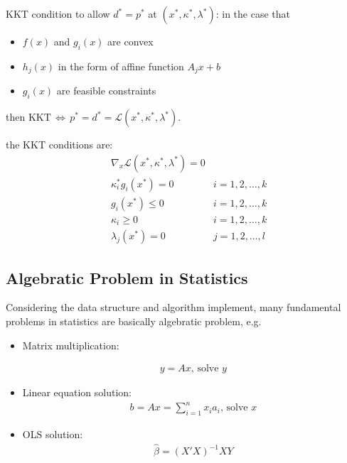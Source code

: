     KKT condition to allow $ d^*=p^* $ at $ (x^*,\kappa ^*,\lambda ^*) $: in the case that
\begin{itemize}[topsep=2pt,itemsep=0pt]
    \item $ f(x) $ and $ g_i(x) $ are convex
    \item $ h_j(x) $ in the form of affine function $ A_jx+b $
    \item $ g_i(x) $ are feasible constraints
\end{itemize}

    then $ \mathrm{KKT}\,\Leftrightarrow\, p^*=d^*=\mathcal{L}(x^*,\kappa ^*,\lambda ^*)  $.

    the KKT conditions are:
\begin{equation}\label{EqaKKTCondition}
    \begin{aligned}
    &\nabla_x\mathcal{L}(x^*,\kappa ^*,\lambda ^*)=0&\\
    &\kappa ^*_ig_i(x^*)=0&i=1,2,\ldots,k\\
    &g_i(x^*)\leq 0&i=1,2,\ldots,k\\
    &\kappa _i\geq 0&i=1,2,\ldots,k\\
    &\lambda _j(x^*)=0&j=1,2,\ldots,l
    \end{aligned}
\end{equation}

    
    
    
     







\subsection{Algebratic Problem in Statistics}\label{SubSectionAlgebraticProblemInStatistics}
   Considering the data structure and algorithm implement, many fundamental problems in statistics are basically algebratic problem, e.g.

\begin{itemize}[topsep=2pt,itemsep=0pt]
    \item Matrix multiplication:
    
    \begin{align}
        y=Ax,\,\text{solve } y 
    \end{align}
    \item Linear equation solution:
    \begin{align}
        b=Ax=\sum_{i=1}^nx_ia_i,\, \text{solve } x
    \end{align}
    \item OLS solution:
    \begin{align}
        \hat{\beta }=(X'X)^{-1}XY 
    \end{align}
\end{itemize}

